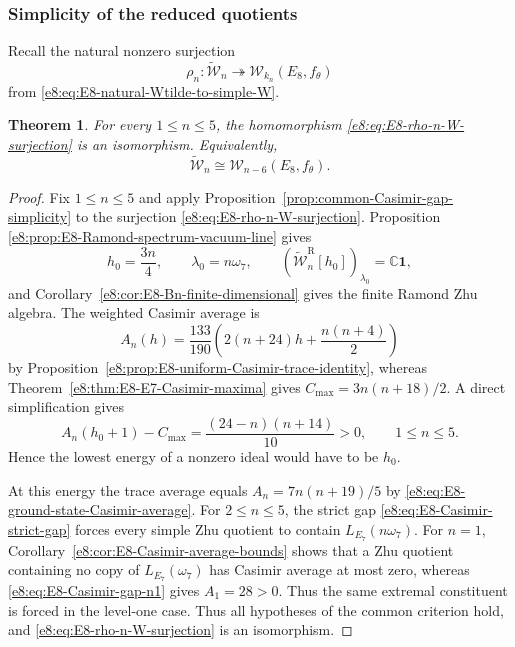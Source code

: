 \documentclass[11pt,reqno]{amsart}
\newtheorem{theorem}{Theorem}[section]
\theoremstyle{definition}
\theoremstyle{remark}
\providecommand{\C}{\mathbb{C}}
\providecommand{\Vac}{\mathbf{1}}
\providecommand{\W}{\mathcal{W}}
\begin{document}
\subsubsection{Simplicity of the reduced quotients}


Recall the natural nonzero surjection
\begin{equation}
  \rho_n\colon\widetilde{\W}_n
  \twoheadrightarrow\W_{k_n}(E_8,f_\theta)
  \label{e8:eq:E8-rho-n-W-surjection}
\end{equation}
from \eqref{e8:eq:E8-natural-Wtilde-to-simple-W}.

\begin{theorem}
\label{e8:thm:E8-Wtilde-simple-all-n}
For every $1\le n\le5$, the homomorphism \eqref{e8:eq:E8-rho-n-W-surjection}
is an isomorphism.  Equivalently,
\begin{equation*}
  \widetilde{\W}_n
  \cong\W_{n-6}(E_8,f_\theta).
\end{equation*}
\end{theorem}

\begin{proof}
Fix $1\le n\le5$ and apply
Proposition~\ref{prop:common-Casimir-gap-simplicity} to the surjection
\eqref{e8:eq:E8-rho-n-W-surjection}.  Proposition
\ref{e8:prop:E8-Ramond-spectrum-vacuum-line} gives
\[
 h_0=\frac{3n}{4},
 \qquad
 \lambda_0=n\omega_7,
 \qquad
 \left(\widetilde{\W}_n^{\mathrm R}[h_0]\right)_{\lambda_0}
 =\C\Vac,
\]
and Corollary~\ref{e8:cor:E8-Bn-finite-dimensional} gives the finite
Ramond Zhu algebra.  The weighted Casimir average is
\[
 A_n(h)=\frac{133}{190}
 \left(2(n+24)h+\frac{n(n+4)}2\right)
\]
by Proposition~\ref{e8:prop:E8-uniform-Casimir-trace-identity}, whereas
Theorem~\ref{e8:thm:E8-E7-Casimir-maxima} gives
$C_{\max}=3n(n+18)/2$.  A direct simplification gives
\[
 A_n(h_0+1)-C_{\max}
 =\frac{(24-n)(n+14)}{10}>0,
 \qquad 1\le n\le5.
\]
Hence the lowest energy of a nonzero ideal would have to be $h_0$.

At this energy the trace average equals
$A_n=7n(n+19)/5$ by
\eqref{e8:eq:E8-ground-state-Casimir-average}.  For $2\le n\le5$, the
strict gap \eqref{e8:eq:E8-Casimir-strict-gap} forces every simple Zhu
quotient to contain $L_{E_7}(n\omega_7)$.  For $n=1$,
Corollary~\ref{e8:cor:E8-Casimir-average-bounds} shows that a Zhu quotient
containing no copy of $L_{E_7}(\omega_7)$ has Casimir average at most zero,
whereas \eqref{e8:eq:E8-Casimir-gap-n1} gives $A_1=28>0$.  Thus the same
extremal constituent is forced in the level-one case.  Thus all hypotheses of the
common criterion hold, and \eqref{e8:eq:E8-rho-n-W-surjection} is an
isomorphism.
\end{proof}
\end{document}
